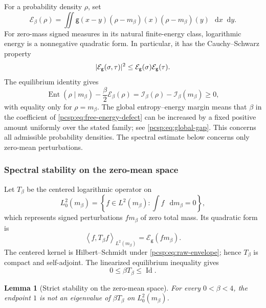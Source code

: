 \documentclass[11pt,reqno]{amsart}
\numberwithin{equation}{section}
\theoremstyle{plain}
\newtheorem{lemma}[lemma]{Lemma}
\theoremstyle{definition}
\DeclarePairedDelimiter{\abs}{\lvert}{\rvert}
\newcommand{\dd}{\mathop{}\!\mathrm d}
\newcommand{\Id}{\operatorname{Id}}
\newcommand{\be}{\beta}
\newcommand{\g}{\mathsf g}
\newcommand{\Ent}{\operatorname{Ent}}
\newcommand{\Ecal}{\mathcal E}
\newcommand{\pcspip}[2]{\left\langle #1,#2\right\rangle}
\begin{document}
For a probability density $\rho$, set
\begin{equation}\label{pcsp:eq:centered-energy}
 \Ecal_\be(\rho)
 =\iint\g(x-y)(\rho-m_\be)(x)(\rho-m_\be)(y)\,\dd x\dd y.
\end{equation}
For zero-mass signed measures in its natural finite-energy class, logarithmic energy is a nonnegative quadratic form.  In particular, it has the Cauchy--Schwarz property
\begin{equation}\label{pcsp:eq:energy-CS}
 \abs{\Ecal_\g(\sigma,\tau)}^2
 \leq\Ecal_\g(\sigma)\Ecal_\g(\tau).
\end{equation}
The equilibrium identity gives
\begin{equation}\label{pcsp:eq:free-energy-defect}
 \Ent(\rho\mid m_\be)-\frac\be2\Ecal_\be(\rho)
 =\mathcal I_\be(\rho)-\mathcal I_\be(m_\be)\geq0,
\end{equation}
with equality only for $\rho=m_\be$. The global entropy--energy margin means that $\be$ in the coefficient of \eqref{pcsp:eq:free-energy-defect} can be increased by a fixed positive amount uniformly over the stated family; see \eqref{pcsp:eq:global-gap}. This concerns all admissible probability densities. The spectral estimate below concerns only zero-mean perturbations.

\subsubsection{Spectral stability on the zero-mean space}

Let $T_\be$ be the centered logarithmic operator on
\begin{equation}\label{pcsp:eq:centered-space}
 L_0^2(m_\be)=\left\{f\in L^2(m_\be):\int f\,\dd m_\be=0\right\},
\end{equation}
which represents signed perturbations $fm_\be$ of zero total mass. Its quadratic form is
\begin{equation}\label{pcsp:eq:T-quadratic-form}
 \pcspip{f}{T_\be f}_{L^2(m_\be)}
 =\Ecal_\g(fm_\be).
\end{equation}
The centered kernel is Hilbert--Schmidt under \eqref{pcsp:eq:raw-envelope}; hence $T_\be$ is compact and self-adjoint.  The linearized equilibrium inequality gives
\begin{equation}\label{pcsp:eq:linearized-nonstrict}
 0\leq\be T_\be\leq\Id.
\end{equation}

\begin{lemma}[Strict stability on the zero-mean space]\label{pcsp:lem:tangent-reduction}
For every $0<\be<4$, the endpoint $1$ is not an eigenvalue of $\be T_\be$ on $L_0^2(m_\be)$.
\end{lemma}
\end{document}
